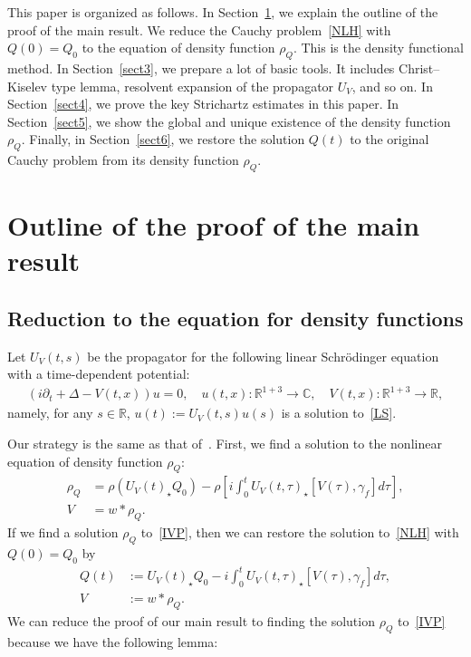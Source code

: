 \documentclass[10pt,a4paper]{amsart}
\newcommand{\BC}{\mathbb{C}}
\newcommand{\BR}{\mathbb{R}}
\newcommand{\ga}{\gamma}
\newcommand{\ta}{\tau}
\newcommand{\rh}{\rho}
\newcommand{\De}{\Delta}
\newcommand{\pl}{\partial}
\newcommand{\Dk}[1]{\left[#1\right]}
\newcommand{\st}{\star}
\begin{document}
This paper is organized as follows. In Section~\ref{sect2}, we explain the outline of the proof of the main result. We reduce the Cauchy problem~\eqref{NLH} with $Q(0)=Q_0$ to the equation of density function $\rh_Q$. This is the density functional method. In Section~\ref{sect3}, we prepare a lot of basic tools. It includes Christ--Kiselev type lemma, resolvent expansion of the propagator $U_V$, and so on. In Section~\ref{sect4}, we prove the key Strichartz estimates in this paper. In Section~\ref{sect5}, we show the global and unique existence of the density function $\rh_Q$. Finally, in Section~\ref{sect6}, we restore the solution $Q(t)$ to the original Cauchy problem from its density function $\rh_Q$.



\section{Outline of the proof of the main result}\label{sect2}
\subsection{Reduction to the equation for density functions}

Let $U_V(t,s)$ be the propagator for the following linear Schr\"odinger equation with a time-dependent potential:
\begin{align}\label{LS}
(i \pl_t + \De -V(t,x))u = 0, \quad u(t,x) : \BR^{1+3} \to \BC, \quad V(t,x):\BR^{1+3} \to \BR,
\end{align}
namely, for any $s \in \BR$, $u(t):= U_V(t,s)u(s)$ is a solution to~\eqref{LS}.

Our strategy is the same as that of~\cite{2018CHP,2014LS}. First, we find a solution to the nonlinear equation of density function $\rh_Q$:
\begin{align}
\tag{IVP} 
\rh_Q &= \rh(U_V(t)_\st Q_0) - \rh\Dk{i\int_0^t U_V(t,\ta)_\st [V(\ta),\ga_f] d\ta}, \label{IVP}\\
V &=w \ast \rh_Q.
\end{align}
If we find a solution $\rh_Q$ to~\eqref{IVP}, then we can restore the solution to~\eqref{NLH} with $Q(0)=Q_0$ by
\begin{align}\label{eq Q}
Q(t) &:= U_V(t)_\st Q_0 - i\int_0^t U_V(t,\ta)_\st [V(\ta),\ga_f] d\ta, \\
V &:= w \ast \rh_Q.
\end{align}
We can reduce the proof of our main result to finding the solution $\rh_Q$ to~\eqref{IVP} because we have the following lemma:
\end{document}
